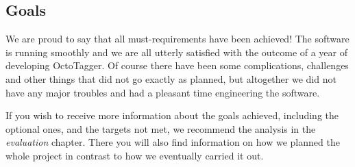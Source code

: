 \subsection{Goals}
We are proud to say that all must-requirements have been achieved! The software is running smoothly and we are all utterly satisfied with the outcome of a year of developing OctoTagger. Of course there have been some complications, challenges and other things that did not go exactly as planned, but altogether we did not have any major troubles and had a pleasant time engineering the software.

If you wish to receive more information about the goals achieved, including the optional ones, and the targets not met, we recommend the analysis in the \textit{evaluation} chapter. There you will also find information on how we planned the whole project in contrast to how we eventually carried it out.




















